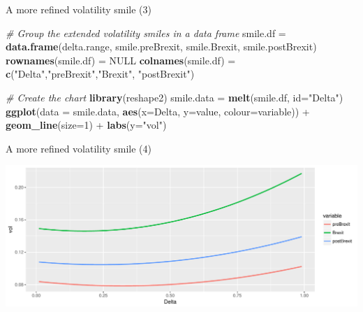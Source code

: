 \documentclass[ignorenonframetext,aspectratio=169]{beamer}
\newenvironment{Shaded}{}{}
\newcommand{\KeywordTok}[1]{\textcolor[rgb]{0.00,0.44,0.13}{\textbf{#1}}}
\newcommand{\DataTypeTok}[1]{\textcolor[rgb]{0.56,0.13,0.00}{#1}}
\newcommand{\DecValTok}[1]{\textcolor[rgb]{0.25,0.63,0.44}{#1}}
\newcommand{\StringTok}[1]{\textcolor[rgb]{0.25,0.44,0.63}{#1}}
\newcommand{\CommentTok}[1]{\textcolor[rgb]{0.38,0.63,0.69}{\textit{#1}}}
\newcommand{\OtherTok}[1]{\textcolor[rgb]{0.00,0.44,0.13}{#1}}
\newcommand{\OperatorTok}[1]{\textcolor[rgb]{0.40,0.40,0.40}{#1}}
\newcommand{\NormalTok}[1]{#1}
\begin{document}
\begin{frame}[fragile]{A more refined volatility smile (3)}

\begin{Shaded}
\begin{Highlighting}[]
\CommentTok{# Group the extended volatility smiles in a data frame}
\NormalTok{smile.df =}\StringTok{ }\KeywordTok{data.frame}\NormalTok{(delta.range, smile.preBrexit, }
\NormalTok{                      smile.Brexit, smile.postBrexit)}
\KeywordTok{rownames}\NormalTok{(smile.df) =}\StringTok{ }\OtherTok{NULL}
\KeywordTok{colnames}\NormalTok{(smile.df) =}\StringTok{ }\KeywordTok{c}\NormalTok{(}\StringTok{"Delta"}\NormalTok{,}\StringTok{"preBrexit"}\NormalTok{,}\StringTok{"Brexit"}\NormalTok{, }\StringTok{"postBrexit"}\NormalTok{)}

\CommentTok{# Create the chart}
\KeywordTok{library}\NormalTok{(reshape2)}
\NormalTok{smile.data =}\StringTok{ }\KeywordTok{melt}\NormalTok{(smile.df, }\DataTypeTok{id=}\StringTok{"Delta"}\NormalTok{)}
\KeywordTok{ggplot}\NormalTok{(}\DataTypeTok{data =}\NormalTok{ smile.data, }\KeywordTok{aes}\NormalTok{(}\DataTypeTok{x=}\NormalTok{Delta, }\DataTypeTok{y=}\NormalTok{value, }\DataTypeTok{colour=}\NormalTok{variable)) }\OperatorTok{+}
\StringTok{  }\KeywordTok{geom_line}\NormalTok{(}\DataTypeTok{size=}\DecValTok{1}\NormalTok{) }\OperatorTok{+}\StringTok{ }\KeywordTok{labs}\NormalTok{(}\DataTypeTok{y=}\StringTok{"vol"}\NormalTok{)}
\end{Highlighting}
\end{Shaded}

\end{frame}

\begin{frame}{A more refined volatility smile (4)}

\includegraphics[width=1\linewidth]{2018_02_07_IMF_FXCourse_files/figure-beamer/unnamed-chunk-37-1}

\end{frame}
\end{document}
